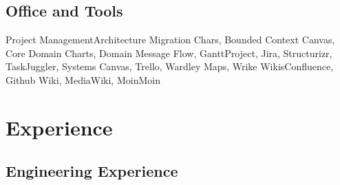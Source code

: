 \documentclass[11pt,a4paper,nolmodern,colorlinks=true,linkcolor=true]{moderncv}
\begin{document}
\subsection{Office and Tools}
           {Project Management}{Architecture Migration Chars, Bounded Context Canvas, Core Domain Charts, Domain Message Flow, GanttProject, Jira, Structurizr, TaskJuggler, Systems Canvas, Trello, Wardley Maps, Wrike}
           {Wikis}{Confluence, Github Wiki, MediaWiki, MoinMoin}

\newpage

\section{Experience}
\subsection{Engineering Experience}

\end{document}
